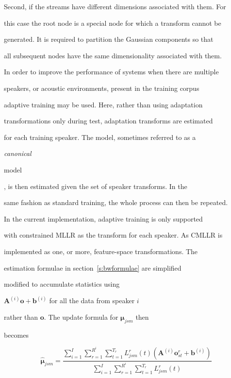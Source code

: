 Second, if the streams have different dimensions associated with them. For


this case the root node is a special node for which a transform cannot be 


generated. It is required to partition the Gaussian components so that 


all subsequent nodes have the same dimensionality associated with them.










In order to improve the performance of systems when there are multiple


speakers, or acoustic environments, present in the training corpus 


adaptive training may be used. Here, rather than using adaptation


transformations only during test, adaptation transforms are estimated


for each training speaker. The model, sometimes referred to as a {\em canonical


model}, is then estimated given the set of speaker transforms. In the


same fashion as standard training, the whole process can then be repeated.





In the current implementation, adaptive training is only supported


with constrained MLLR as the transform for each speaker. As CMLLR is


implemented as one, or more, feature-space transformations. The


estimation formulae in section~\ref{s:bwformulae} are simplified


modified to accumulate statistics using


$\bm{A}^{(i)}\bm{o}+\bm{b}^{(i)}$ for all the data from speaker $i$


rather than $\bm{o}$. The update formula for $\bm{\mu}_{jsm}$ then


becomes


\newcommand{\satliksum}[1]{


                  \sum_{i=1}^I\sum_{r=1}^{R^i}  \sum_{t=1}^{T_r} L^r_{#1}(t)


}


\[


   \hat{\bm{\mu}}_{jsm} = \frac{


                \satliksum{jsm}(\bm{A}^{(i)}\bm{o}^r_{st}+\bm{b}^{(i)})}{\satliksum{jsm}}


\]





